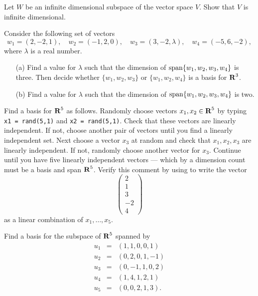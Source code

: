 \documentclass{ximera}
\begin{document}
\begin{exercise}  \label{c5.6.3A}
Let $W$ be an infinite dimensional subspace of the vector space $V$.
Show that $V$ is infinite dimensional.
\end{exercise}


\CEXER

\begin{exercise} \label{c5.6.4}
Consider the following set of vectors
\[
w_1 = (2, -2, 1), \quad
w_2 = (-1, 2, 0), \quad
w_3 = (3, -2, \lambda), \quad
w_4 = (-5, 6, -2),
\]
where $\lambda$ is a real number.
\begin{itemize}
\item[(a)] Find a value for $\lambda$ such that the
dimension of ${\rm span}\{w_1,w_2,w_3,w_4\}$ is three. Then decide
whether $\{w_1,w_2,w_3\}$ or $\{w_1,w_2,w_4\}$ is a basis for
$\mbox{$\bf{R}$}^3$.
\item[(b)] Find a value for $\lambda$ such that the
dimension of ${\rm span}\{w_1,w_2,w_3,w_4\}$ is two.
\end{itemize}
\end{exercise}

\begin{exercise} \label{c5.6.5}
Find a basis for $\mbox{$\bf{R}$}^5$ as follows.  Randomly choose vectors $x_1,x_2\in\mbox{$\bf{R}$}^5$
by typing {\tt x1 = rand(5,1)} and {\tt x2 = rand(5,1)}.  Check that these
vectors are linearly independent.  If not, choose another pair of vectors
until you find a linearly independent set.  Next choose a vector $x_3$ at
random and check that $x_1,x_2,x_3$ are linearly independent.  If not,
randomly choose another vector for $x_3$. Continue until you have five
linearly independent vectors --- which by a dimension count must be a
basis and span $\mbox{$\bf{R}$}^5$.  Verify this comment by using \Matlab
to write the vector
\[
\left(\begin{array}{r} 2 \\ 1 \\ 3\\ -2 \\ 4 \end{array}\right)
\]
as a linear combination of $x_1,\ldots,x_5$.
\end{exercise}

\begin{exercise} \label{c5.6.6}
Find a basis for the subspace of $\mbox{$\bf{R}$}^5$ spanned by
\begin{equation*}
\begin{array}{rcl}
u_1 & = & (1,1,0,0,1) \\
u_2 & = & (0,2,0,1,-1)  \\
u_3 & = & (0,-1,1,0,2)   \\
u_4 & = & (1,4,1,2,1)  \\
u_5 & = & (0,0,2,1,3).
\end{array}
\end{equation*}
\end{exercise}
\end{document}
